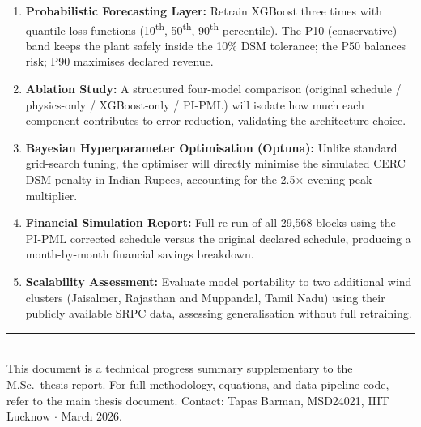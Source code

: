 \documentclass[11pt,a4paper]{article}
\begin{document}
\begin{enumerate}[leftmargin=*, itemsep=5pt]
  \item \textbf{Probabilistic Forecasting Layer:}
    Retrain XGBoost three times with quantile loss functions (10\textsuperscript{th}, 50\textsuperscript{th}, 90\textsuperscript{th} percentile). The P10 (conservative) band keeps the plant safely inside the 10\% DSM tolerance; the P50 balances risk; P90 maximises declared revenue.

  \item \textbf{Ablation Study:}
    A structured four-model comparison (original schedule / physics-only / XGBoost-only / PI-PML) will isolate how much each component contributes to error reduction, validating the architecture choice.

  \item \textbf{Bayesian Hyperparameter Optimisation (Optuna):}
    Unlike standard grid-search tuning, the optimiser will directly minimise the simulated CERC DSM penalty in Indian Rupees, accounting for the 2.5$\times$ evening peak multiplier.

  \item \textbf{Financial Simulation Report:}
    Full re-run of all 29,568 blocks using the PI-PML corrected schedule versus the original declared schedule, producing a month-by-month financial savings breakdown.

  \item \textbf{Scalability Assessment:}
    Evaluate model portability to two additional wind clusters (Jaisalmer, Rajasthan and Muppandal, Tamil Nadu) using their publicly available SRPC data, assessing generalisation without full retraining.
\end{enumerate}

\vspace{0.5cm}
\noindent\rule{\linewidth}{0.4pt}\\[4pt]
{\small\color{gray}
  This document is a technical progress summary supplementary to the M.Sc.\ thesis report.
  For full methodology, equations, and data pipeline code, refer to the main thesis document.
  Contact: Tapas Barman, MSD24021, IIIT Lucknow $\cdot$ March 2026.
}
\end{document}

